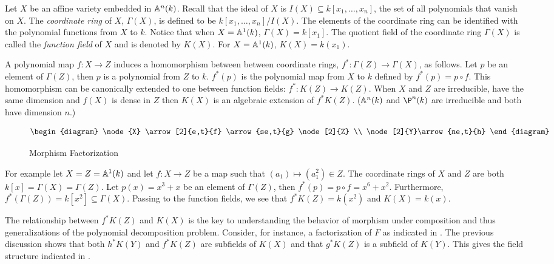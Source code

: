 Let $X$ be an affine variety embedded in $\mathbb{A}^n(k)$.  Recall that the
ideal of $X$ is $I(X) \subseteq k[x_1, \ldots, x_n]$, the set of all
polynomials that vanish on $X$.  The {\em coordinate ring} of $X$,
$\Gamma(X)$, is defined to be $k[x_1, \ldots, x_n]/I(X)$.  The
elements of the coordinate ring can be identified with the polynomial
functions from $X$ to $k$.  Notice that when $X = \mathbb{A}^1(k)$, $\Gamma(X)
= k[x_1]$.  The quotient field of the coordinate ring $\Gamma(X)$ is
called the {\em function field} of $X$ and is denoted by $K(X)$.  For
$X=\mathbb{A}^1(k)$, $K(X) = k(x_1)$.

A polynomial map $f: X \rightarrow Z$ induces a homomorphism between
between coordinate rings, $f^{\ast}: \Gamma(Z) \rightarrow
\Gamma(X)$, as follows.  Let $p$ be an element of $\Gamma(Z)$, then $p$ is a
polynomial from $Z$ to $k$.  $f^{\ast}(p)$ is the polynomial map from
$X$ to $k$ defined by $f^{\ast}(p) = p \circ f$.  This homomorphism
can be canonically extended to one between function fields:
$f^{\ast}:K(Z) \rightarrow K(Z)$.  When $X$ and $Z$ are
irreducible, have the same dimension and $f(X)$ is dense in $Z$ then
$K(X)$ is an algebraic extension of $f^{\ast} K(Z)$.  ($\mathbb{A}^n(k)$ and
$\P^n(k)$ are irreducible and both have dimension $n$.)

\begin{figure}
\[
\begin{diagram}
\node{X} \arrow[2]{e,t}{f} \arrow{se,t}{g} \node[2]{Z} \\
\node[2]{Y}\arrow{ne,t}{h} 
\end{diagram}
\]
\caption{Morphism Factorization \label{Morphism:Factorization:Fig}}
\end{figure}

For example let $X = Z = \mathbb{A}^1(k)$ and let $f : X \rightarrow Z$ be
a map such that $(a_1) \mapsto (a_1^2) \in Z$.  The coordinate rings
of $X$ and $Z$ are both $k[x] = \Gamma(X) = \Gamma(Z)$.  Let $p(x) =
x^3+x$ be an element of $\Gamma(Z)$, then $f^{\ast}(p) = p \circ f =
x^6+x^2$. Furthermore, $f^{\ast}(\Gamma(Z)) = k[x^2] \subseteq
\Gamma(X)$.  Passing to the function fields, we see that $f^{\ast}K(Z)
= k(x^2)$ and $K(X) = k(x)$.

The relationship between $f^{\ast}K(Z)$ and $K(X)$ is the key to
understanding the behavior of morphism under composition and thus
generalizations of the polynomial decomposition problem.  Consider, for
instance, a factorization of $F$ as indicated in
.  The previous discussion shows
that both $h^{\ast}K(Y)$ and $f^{\ast}K(Z)$ are subfields of $K(X)$
and that $g^{\ast}K(Z)$ is a subfield of $K(Y)$.  This gives the
field structure indicated in .

